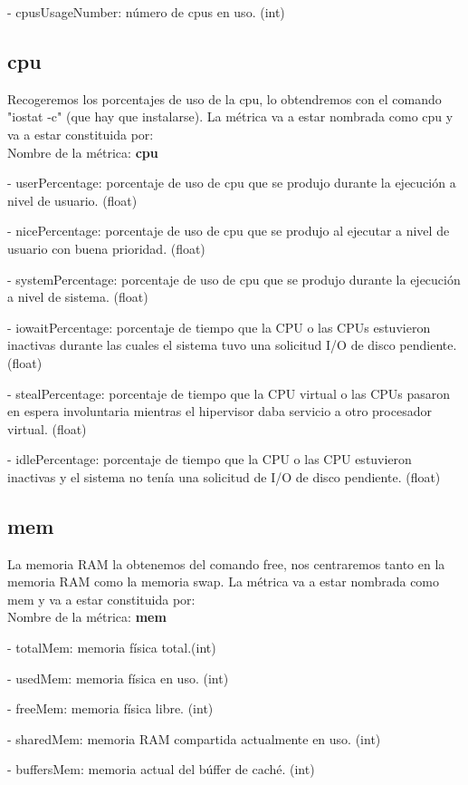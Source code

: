 \documentclass[ spanish, a4paper, 12pt, oneside]{report}
\begin{document}
\hyp{} cpusUsageNumber: número de cpus en uso. (int)

\subsection{cpu}
Recogeremos los porcentajes de uso de la cpu, lo obtendremos con el comando "iostat -c" (que hay que instalarse). 
La métrica va a estar nombrada como cpu y va a estar constituida por:\\

Nombre de la métrica: \textbf{cpu}

\hyp{} userPercentage: porcentaje de uso de cpu que se produjo durante la ejecución a nivel de usuario. (float)

\hyp{} nicePercentage: porcentaje de uso de cpu que se produjo al ejecutar a nivel de usuario con buena prioridad. (float)

\hyp{} systemPercentage: porcentaje de uso de cpu que se produjo durante la ejecución a nivel de sistema. (float) 

\hyp{} iowaitPercentage: porcentaje de tiempo que la CPU o las CPUs estuvieron inactivas durante las cuales el sistema tuvo una solicitud I/O de disco pendiente. (float)

\hyp{} stealPercentage: porcentaje de tiempo que la CPU virtual o las CPUs pasaron en espera involuntaria mientras el hipervisor daba servicio a otro procesador virtual. (float)

\hyp{} idlePercentage: porcentaje de tiempo que la CPU o las CPU estuvieron inactivas y el sistema no tenía una solicitud de I/O de disco pendiente. (float)

\subsection{mem}
La memoria RAM la obtenemos del comando free, nos centraremos tanto en la memoria RAM
como la memoria swap. La métrica va a estar nombrada como mem y va a estar constituida por:\\

Nombre de la métrica: \textbf{mem}

\hyp{} totalMem: memoria física total.(int)

\hyp{} usedMem: memoria física en uso. (int)

\hyp{} freeMem: memoria física libre. (int)

\hyp{} sharedMem: memoria RAM compartida actualmente en uso. (int)

\hyp{} buffersMem: memoria actual del búffer de caché. (int)
\end{document}
